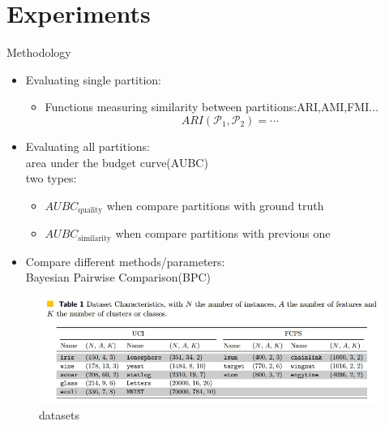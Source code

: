 \documentclass{beamer}
\begin{document}
\section{Experiments}
\begin{frame}{Methodology}
    \begin{itemize}
        \item Evaluating single partition:
        \begin{itemize}
            \item Functions measuring similarity between partitions:ARI,AMI,FMI...
            $$ARI(\mathcal{P}_1,\mathcal{P}_2)=\cdots$$
        \end{itemize}
        \item Evaluating all partitions:
        \\ area under the budget curve(AUBC)
        \\ two types:
        \begin{itemize}
            \item $AUBC_\text{quality}$ when compare partitions with ground truth
            \item $AUBC_\text{similarity}$ when compare partitions with previous one
        \end{itemize}
        \item Compare different methods/parameters:\\
        Bayesian Pairwise Comparison(BPC)

    \end{itemize}
    \begin{figure}
        \centering
        \includegraphics[width=0.5\linewidth]{./images/data.jpg}
        \caption{datasets}
    \end{figure}
\end{frame}
\end{document}
